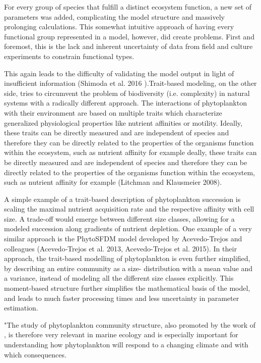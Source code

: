 For every group of species that fulfill a distinct ecosystem function, a new set of parameters was added, complicating the model structure and massively prolonging calculations. This somewhat intuitive approach of having every functional group represented in a model, however, did create problems. First and foremost, this is the lack and inherent uncertainty of data from field and culture experiments to constrain functional types. 

This again leads to the difficulty of validating the model output in light of insufficient information (Shimoda et al. 2016 ).Trait-based modeling, on the other side, tries to circumvent the problem of biodiversity (i.e. complexity) in natural systems with a radically different approach. The interactions of phytoplankton with their environment are based on multiple traits which characterize generalized physiological properties like nutrient affinities or motility. Ideally, these traits can be directly measured and are independent of species and therefore they can be directly related to the properties of the organisms function within the ecosystem, such as nutrient affinity for example deally, these traits can be directly measured and are independent of species and therefore they can be directly related to the properties of the organisms function within the ecosystem, such as nutrient affinity for example (Litchman and Klausmeier 2008).  


A simple example of a trait-based description of phytoplankton succession is scaling the maximal nutrient acquisition rate and the respective affinity with cell size. A trade-off would emerge between different size classes, allowing for a modeled succession along gradients of nutrient depletion. One example of a very similar approach is the PhytoSFDM model developed by Acevedo-Trejos and colleagues (Acevedo‐Trejos et al. 2013, Acevedo-Trejos et al. 2015). In their approach, the trait-based modelling of phytoplankton is even further simplified, by describing an entire community as a size- distribution with a mean value and a variance, instead of modeling all the different size classes explicitly. This moment-based structure further simplifies the mathematical basis of the model, and leads to much faster processing times and less uncertainty in parameter estimation.

"The study of phytoplankton community structure, also promoted by the work of \citet{Falkowski1998}, is therefore very relevant in marine ecology and is especially important for understanding how phytoplankton will respond to a changing climate and with which consequences.



